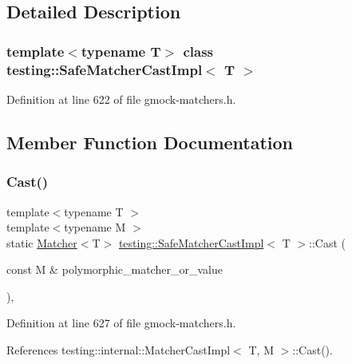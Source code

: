 \subsection{Detailed Description}
\subsubsection*{template$<$typename T$>$\newline
class testing\+::\+Safe\+Matcher\+Cast\+Impl$<$ T $>$}



Definition at line 622 of file gmock-\/matchers.\+h.



\subsection{Member Function Documentation}
\mbox{\label{classtesting_1_1SafeMatcherCastImpl_a6ceab2bd71bff1677ed184eb2afa8653}} 
\subsubsection{\texorpdfstring{Cast()}{Cast()}\hspace{0.1cm}{\footnotesize\ttfamily [1/2]}}
{\footnotesize\ttfamily template$<$typename T $>$ \\
template$<$typename M $>$ \\
static \hyperlink{classtesting_1_1Matcher}{Matcher}$<$T$>$ \hyperlink{classtesting_1_1SafeMatcherCastImpl}{testing\+::\+Safe\+Matcher\+Cast\+Impl}$<$ T $>$\+::Cast (\begin{DoxyParamCaption}\item[{const M \&}]{polymorphic\+\_\+matcher\+\_\+or\+\_\+value }\end{DoxyParamCaption})\hspace{0.3cm}{\ttfamily [inline]}, {\ttfamily [static]}}



Definition at line 627 of file gmock-\/matchers.\+h.



References testing\+::internal\+::\+Matcher\+Cast\+Impl$<$ T, M $>$\+::\+Cast().




